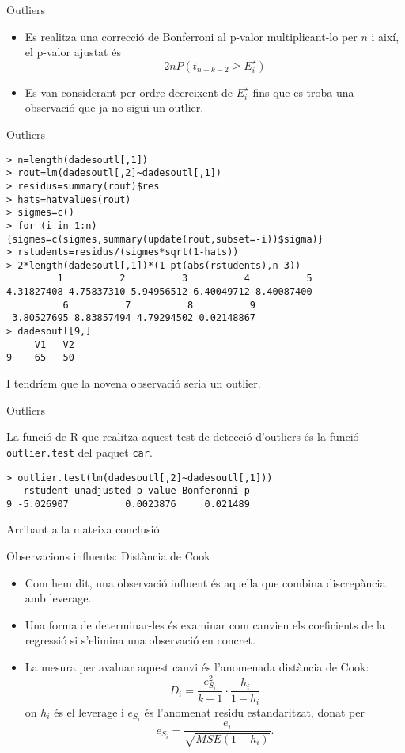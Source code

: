 \documentclass[12pt,t]{beamer}
\renewcommand{\geq}{\geqslant}
\theoremstyle{plain}
\theoremstyle{definition}
\begin{document}
\begin{frame}{Outliers}
\begin{itemize}
\item Es realitza una correcció de Bonferroni al p-valor multiplicant-lo per $n$ i així, el p-valor ajustat és
$$2nP(t_{n-k-2}\geq E_i^\star)$$ 
\item Es van considerant per ordre decreixent de $E_i^\star$ fins que es troba una observació que ja no sigui un outlier.
\end{itemize}
\end{frame}

\begin{frame}[fragile]{Outliers}
\begin{footnotesize}

\begin{verbatim}
> n=length(dadesoutl[,1])
> rout=lm(dadesoutl[,2]~dadesoutl[,1])
> residus=summary(rout)$res
> hats=hatvalues(rout)
> sigmes=c()
> for (i in 1:n)
{sigmes=c(sigmes,summary(update(rout,subset=-i))$sigma)}
> rstudents=residus/(sigmes*sqrt(1-hats))
> 2*length(dadesoutl[,1])*(1-pt(abs(rstudents),n-3))
         1          2          3          4          5 
4.31827408 4.75837310 5.94956512 6.40049712 8.40087400
          6          7          8          9   
 3.80527695 8.83857494 4.79294502 0.02148867
> dadesoutl[9,]
     V1   V2
9    65   50
\end{verbatim}
\end{footnotesize}
I tendríem que la novena observació seria un outlier.
\end{frame}

\begin{frame}[fragile]{Outliers}

La funció de R que realitza aquest test de detecció d'outliers és la funció \texttt{outlier.test} del paquet \texttt{car}. 

\begin{verbatim}
> outlier.test(lm(dadesoutl[,2]~dadesoutl[,1]))
   rstudent unadjusted p-value Bonferonni p
9 -5.026907          0.0023876     0.021489
\end{verbatim}
Arribant a la mateixa conclusió.

\end{frame}

\begin{frame}{Observacions influents: Distància de Cook}

\begin{itemize}
\item Com hem dit, una observació influent és aquella que combina discrepància amb leverage.
\item Una forma de determinar-les és examinar com canvien els coeficients de la regressió si s'elimina una observació en concret.
\item La mesura per avaluar aquest canvi és l'anomenada distància de Cook:
$$D_i=\frac{e^2_{S_i}}{k+1}\cdot\frac{h_i}{1-h_i}$$
on $h_i$ és el leverage i $e_{S_i}$ és l'anomenat residu estandaritzat, donat per
$$e_{S_i}=\frac{e_i}{\sqrt{MSE(1-h_i)}}.$$

\end{itemize}

\end{frame}
\end{document}
